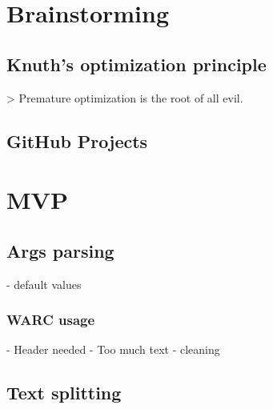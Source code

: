 
\section{Brainstorming}

\subsection{Knuth's optimization principle}

> Premature optimization is the root of all evil.

\subsection{GitHub Projects}

\section{MVP}

\subsection{Args parsing}

- default values

\subsubsection{WARC usage}

- Header needed
- Too much text
- cleaning

\subsection{Text splitting}



